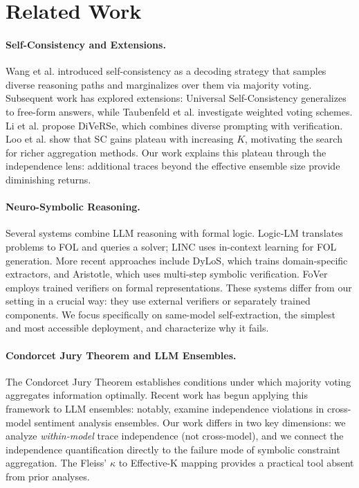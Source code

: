\documentclass[11pt,a4paper]{article}
\begin{document}
\section{Related Work}

\paragraph{Self-Consistency and Extensions.}
Wang et al. \cite{wang2023selfconsistency} introduced self-consistency as a decoding strategy that samples diverse reasoning paths and marginalizes over them via majority voting. Subsequent work has explored extensions: Universal Self-Consistency \cite{chen2023usc} generalizes to free-form answers, while Taubenfeld et al. \cite{taubenfeld2025weighted} investigate weighted voting schemes. Li et al. \cite{li2023diverse} propose DiVeRSe, which combines diverse prompting with verification. Loo et al. \cite{loo2025scaling} show that SC gains plateau with increasing $K$, motivating the search for richer aggregation methods. Our work explains this plateau through the independence lens: additional traces beyond the effective ensemble size provide diminishing returns.

\paragraph{Neuro-Symbolic Reasoning.}
Several systems combine LLM reasoning with formal logic. Logic-LM \cite{pan2023logiclm} translates problems to FOL and queries a solver; LINC \cite{olausson2023linc} uses in-context learning for FOL generation. More recent approaches include DyLoS, which trains domain-specific extractors, and Aristotle, which uses multi-step symbolic verification. FoVer \cite{fover2025} employs trained verifiers on formal representations. These systems differ from our setting in a crucial way: they use external verifiers or separately trained components. We focus specifically on same-model self-extraction, the simplest and most accessible deployment, and characterize why it fails.

\paragraph{Condorcet Jury Theorem and LLM Ensembles.}
The Condorcet Jury Theorem \cite{condorcet1785,austensmith1996} establishes conditions under which majority voting aggregates information optimally. Recent work has begun applying this framework to LLM ensembles: notably, \cite{llmcjt2024} examine independence violations in cross-model sentiment analysis ensembles. Our work differs in two key dimensions: we analyze \emph{within-model} trace independence (not cross-model), and we connect the independence quantification directly to the failure mode of symbolic constraint aggregation. The Fleiss' $\kappa$ to Effective-K mapping provides a practical tool absent from prior analyses.
\end{document}
